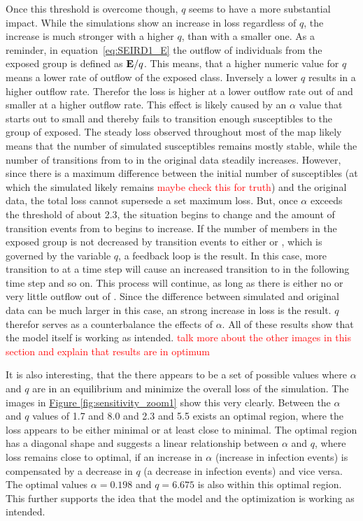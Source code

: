 Once this threshold is overcome though, $q$ seems to have a more substantial impact. While the simulations show
an increase in loss regardless of $q$, the increase is much stronger with a higher $q$, than with a smaller one.
As a reminder, in equation~\ref*{eq:SEIRD1_E} the outflow of individuals from the exposed group is defined as $\text{\textbf{E}}/q$.
This means, that a higher numeric value for $q$ means a lower rate of outflow of the exposed class. Inversely a lower $q$ results
in a higher outflow rate. Therefor the loss is higher at a lower outflow rate out of  and smaller at a higher outflow rate.
This effect is likely caused by an $\alpha$ value that starts out to small and thereby fails to transition enough susceptibles
to the group of exposed. The steady loss observed throughout most of the map likely means that the number of simulated susceptibles
remains mostly stable, while the number of transitions from  to  in the original data steadily increases. However, since 
there is a maximum difference between the initial number of susceptibles (at which the simulated likely remains
\textcolor{red}{maybe check this for truth}) and the original data, the total loss cannot supersede a set maximum loss.
But, once $\alpha$ exceeds the threshold of about 2.3, the situation begins to change and the amount of transition events from
 to  begins to increase. If the number of members in the exposed group is not decreased by transition events to either
 or , which is governed by the variable $q$, a feedback loop is the result. In this case, more transition to  at a time
step will cause an increased transition to  in the following time step and so on. This process will continue, as long as there is
either no or very little outflow out of . Since the difference between simulated and original data can be much larger in this case,
an strong increase in loss is the result. $q$ therefor serves as a counterbalance the effects of $\alpha$. All of these results show
that the model itself is working as intended.
\textcolor{red}{talk more about the other images in this section and explain that results are in optimum}

 It is also interesting, that the there appears to be a set of possible values where $\alpha$ and $q$ are in an equilibrium and 
 minimize the overall loss of the simulation. The images in \hyperref[fig:sensitivity_zoom1]{Figure \ref*{fig:sensitivity_zoom1}}
 show this very clearly. Between the $\alpha$ and $q$ values of 1.7 and 8.0 and 2.3 and 5.5 exists an optimal region, where the
 loss appears to be either minimal or at least close to minimal. The optimal region has a diagonal shape and suggests a linear
 relationship between $\alpha$ and $q$, where loss remains close to optimal, if an increase in $\alpha$ (increase in infection events)
 is compensated by a decrease in $q$ (a decrease in infection events) and vice versa. The optimal values $\alpha = 0.198$ and
 $q = 6.675$ is also within this optimal region. This further supports the idea that the model and the optimization is working as
 intended.


